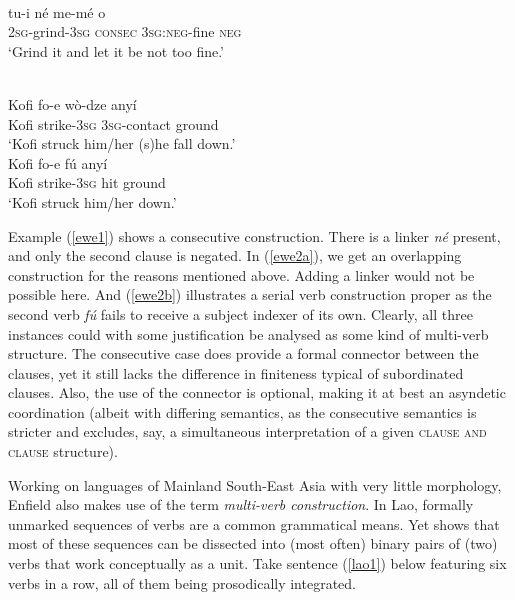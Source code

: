 \ea \label{ewe1} 
\\
\gll tu-i né me-mé o \\
\textsc{2}\textsc{sg}-grind-\textsc{3}\textsc{sg} \textsc{consec} \textsc{3}\textsc{sg}:\textsc{neg}-fine \textsc{neg} \\
\glft `Grind it and let it be not too fine.'\\ 
\z

\ea 
{}\\
\ea \label{ewe2a}
\gll Kofi fo-e wò-dze anyí \\
Kofi strike-\textsc{3}\textsc{sg} \textsc{3}\textsc{sg}-contact ground \\
\glft `Kofi struck him/her (s)he fall down.' \\ 
\ex \label{ewe2b}
\gll Kofi fo-e fú anyí \\ 
Kofi strike-\textsc{3}\textsc{sg} hit ground \\
\glft `Kofi struck him/her down.'\\ 
\z
\z

Example (\ref{ewe1}) shows a consecutive construction. There is a linker \textit{né} present, and only the second clause is negated. In (\ref{ewe2a}), we get an overlapping construction for the reasons mentioned above. Adding a linker would not be possible here. And (\ref{ewe2b}) illustrates a serial verb construction proper as the second verb \textit{fú} fails to receive a subject indexer of its own. Clearly, all three instances could with some justification be analysed as some kind of multi-verb structure. The consecutive case does provide a formal connector between the clauses, yet it still lacks the difference in finiteness typical of subordinated clauses. Also, the use of the connector is optional, making it at best an asyndetic coordination (albeit with differing semantics, as the consecutive semantics is stricter and excludes, say, a simultaneous interpretation of a given \textsc{clause and clause} structure). 

Working on languages of Mainland South-East Asia with very little morphology, Enfield also makes use of the term \textit{multi-verb construction}. In Lao, formally unmarked sequences of verbs are a common grammatical means. Yet \citet{enfield2008verbs} shows that most of these sequences can be dissected into (most often) binary pairs of (two) verbs that work conceptually as a unit. Take sentence (\ref{lao1}) below featuring six verbs in a row, all of them being prosodically integrated.

